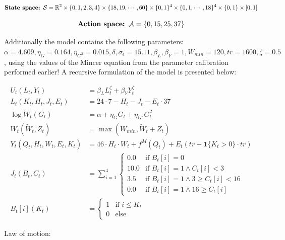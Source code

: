 \begin{equation}
    \textbf{State space: }\mathcal{S} = \mathbb{R}^2 \times \{0, 1, 2, 3, 4\} \times \{18, 19, \cdots , 60\} \times \{0, 1\}^4 \times \{0, 1, \cdots, 18\}^4 \times \{0,1\} \times [0, 1]
\end{equation}

\begin{equation}
    \textbf{Action space: }\mathcal{A} = \{0, 15, 25, 37\}
\end{equation}

Additionally the model contains the following parameters: $\alpha=4.609, \eta_G = 0.164, \eta_{G^{2}}=0.015, \delta, \sigma_\epsilon = 15.11, \beta_L, \beta_Y = 1, W_{min} = 120, tr = 1600, \zeta=0.5$, using the values of the Mincer equation from the parameter calibration performed earlier! A recursive formulation of the model is presented below:

\begin{align}
    U_t(L_t, Y_t) &= \beta_L L_t^{\zeta} + \beta_Y Y_t^{\zeta}\\
    L_t(K_t, H_t, J_t, E_t) &= 24 \cdot 7 - H_t - J_t - E_t \cdot 37\\
    \log \tilde{W}_t (G_t) &= \alpha + \eta_G G_t + \eta_{G^2} G_t^2 \\
    W_t(\tilde{W}_t, Z_t) &= \max(W_{min} , \tilde{W}_t  + Z_t)  \\
    Y_t(Q_t,H_t, W_t, E_t, K_t) &= 46 \cdot H_t \cdot W_t + f^M(Q_t) +  E_t (tr + \mathbf{1} \{ K_t > 0 \} \cdot tr)\\
    J_t (B_t, C_t) &= \sum_{i=1}^4 \begin{cases}
        0.0 & \text{if } B_t[i] = 0 \\
        10.0 & \text{if } B_t[i] = 1 \land C_t[i] < 3 \\
        3.5 & \text{if } B_t[i] = 1 \land 3 \geq C_t[i] < 16 \\
        0.0 & \text{if } B_t[i] = 1 \land  16 \geq  C_t[i] 
    \end{cases} \\
    B_t[i] (K_t) &= \begin{cases}
        1 & \text{if }  i \leq K_t \\
        0 & \text{else}
    \end{cases}
\end{align}

Law of motion:

